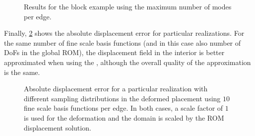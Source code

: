 \documentclass[AMA,STIX1COL,doublespace]{WileyNJD-v2}
\begin{document}
\begin{figure}[htb]
	\centering
	\hfill
	\caption{Results for the block example using the maximum number of modes per edge.}%
	\label{fig:block_2y}
\end{figure}

Finally, \cref{fig:block_contour} shows the absolute displacement error
for particular realizations.
For the same number of fine scale basis functions
(and in this case also number of DoFs in the global ROM),
the displacement field in the
interior is better approximated when using the , although the overall quality of the approximation is the same.

\begin{figure}[htb]
    \centering
    \hfill
    \caption{Absolute displacement error for a particular realization with different sampling distributions in the deformed placement using $10$ fine scale basis functions per edge.
    In both cases, a scale factor of $1$ is used for the deformation and the domain is scaled by the ROM displacement solution.}%
    \label{fig:block_contour}
\end{figure}

\FloatBarrier%
\end{document}
